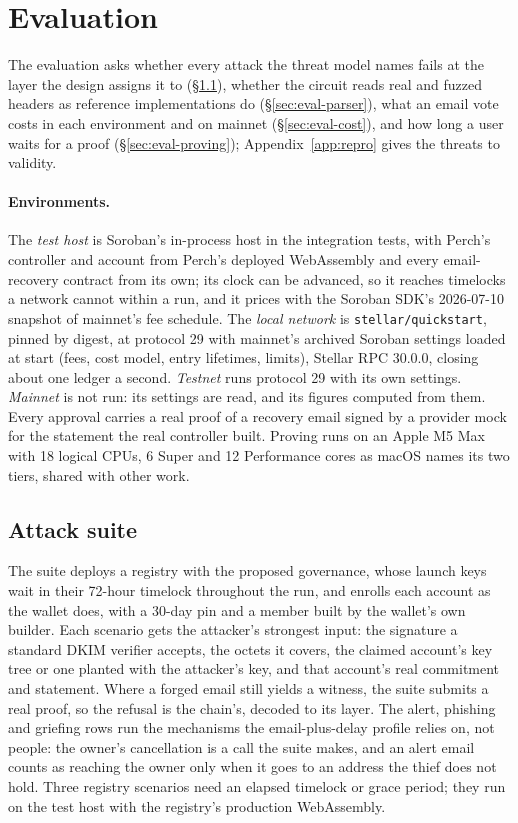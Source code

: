 \section{Evaluation}\label{sec:eval}

The evaluation asks whether every attack the threat model names fails at the
layer the design assigns it to (\S\ref{sec:eval-attacks}), whether the
circuit reads real and fuzzed headers as reference implementations do
(\S\ref{sec:eval-parser}), what an email vote costs in each environment and
on mainnet (\S\ref{sec:eval-cost}), and how long a user waits for a proof
(\S\ref{sec:eval-proving}); Appendix~\ref{app:repro} gives the threats to
validity.

\paragraph{Environments.} The \emph{test host} is Soroban's in-process host
in the integration tests, with Perch's controller and account from Perch's
deployed WebAssembly and every email-recovery contract from its own; its
clock can be advanced, so it reaches timelocks a network cannot within a run,
and it prices with the Soroban SDK's 2026-07-10 snapshot of mainnet's fee
schedule. The \emph{local network} is \texttt{stellar/quickstart}, pinned by
digest, at protocol 29 with mainnet's archived Soroban settings loaded at
start (fees, cost model, entry lifetimes, limits), Stellar RPC 30.0.0,
closing about one ledger a second. \emph{Testnet} runs protocol 29 with its
own settings. \emph{Mainnet} is not run: its settings are read, and its
figures computed from them. Every approval carries a real proof of a recovery
email signed by a provider mock for the statement the real controller built.
Proving runs on an Apple M5 Max with 18 logical CPUs, 6 Super and 12
Performance cores as macOS names its two tiers, shared with other
work.

\subsection{Attack suite}\label{sec:eval-attacks}
The suite deploys a registry with the proposed governance, whose launch keys
wait in their 72-hour timelock throughout the run, and enrolls each account
as the wallet does, with a 30-day pin and a member built by the wallet's own
builder. Each scenario gets the attacker's strongest input: the signature a
standard DKIM verifier accepts, the octets it covers, the claimed account's
key tree or one planted with the attacker's key, and that account's real
commitment and statement. Where a forged email still yields a witness, the
suite submits a real proof, so the refusal is the chain's, decoded to its
layer. The alert, phishing and griefing rows run the mechanisms the
email-plus-delay profile relies on, not people: the owner's cancellation is a
call the suite makes, and an alert email counts as reaching the owner only
when it goes to an address the thief does not hold. Three registry scenarios
need an elapsed timelock or grace period; they run on the test host with the
registry's production WebAssembly.

